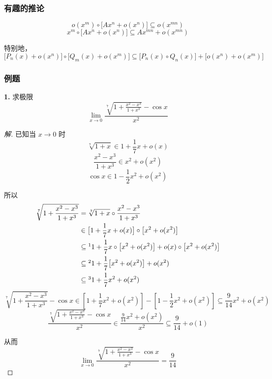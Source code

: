 \subsubsection{有趣的推论}
\begin{theorem}
    \[o(x^m) \circ \bigl[Ax^n + o(x^n)\bigr] \subseteq o(x^{mn}) \tag{1}\]
    \[x^m \circ \bigl[Ax^n + o(x^n)\bigr] \subseteq Ax^{mn} + o(x^{mn}) \tag{2}\]
    
    特别地，
    \[\bigl[P_n(x) + o(x^n)\bigr] \circ \bigl[Q_m(x) + o(x^m)\bigr] \subseteq \big[P_n(x) \circ Q_n(x)\big] + \big[o(x^n) + o(x^m)\big] \tag{3}\]
\end{theorem}

\subsubsection{例题}
\textbf{1.} 求极限
\[\lim_{x \rightarrow 0} \frac{\displaystyle \sqrt[7]{1 + \frac{x^2 - x^3}{1 + x^3}} - \cos x}{x^2}\]
\begin{proof}[解]
    已知当 $x \rightarrow 0$ 时
    \[\sqrt[7]{1 + x} \in 1 + \frac{1}{7}x + o(x)\]
    \[\frac{x^2-x^3}{1+x^3} \in x^2 + o(x^2)\]
    \[\cos x \in 1 - \frac{1}{2}x^2 + o(x^2)\]

    所以
    \begin{align*}
        \sqrt[7]{1 + \frac{x^2 - x^3}{1 + x^3}} &= \sqrt[7]{1 + x} \circ \frac{x^2-x^3}{1+x^3}\\
        &\in \big[1 + \frac{1}{7}x + o(x)\big] \circ \big[x^2 + o(x^2)\big]\\
        &\subseteq\footnotemark 1 + \frac{1}{7} x \circ \big[x^2 + o(x^2)\big] + o(x) \circ \big[x^2 + o(x^2)\big]\\
        &\subseteq\footnotemark 1 + \frac{1}{7}\big[x^2 + o(x^2)\big] + o(x^2)\\
        &\subseteq\footnotemark 1 + \frac{1}{7}x^2 + o(x^2)
    \end{align*}
    \[\sqrt[7]{1 + \frac{x^2 - x^3}{1 + x^3}} - \cos x \in \left[1 + \frac{1}{7}x^2 + o(x^2)\right] - \left[1 - \frac{1}{2}x^2 + o(x^2)\right] \subseteq \frac{9}{14}x^2 + o(x^2)\]
    \[\frac{\displaystyle \sqrt[7]{1 + \frac{x^2 - x^3}{1 + x^3}} - \cos x}{x^2} \in \frac{\displaystyle \frac{9}{14}x^2 + o(x^2)}{x^2} \subseteq \frac{9}{14} + o(1)\]

    从而
    \[\lim_{x \rightarrow 0} \frac{\displaystyle \sqrt[7]{1 + \frac{x^2 - x^3}{1 + x^3}} - \cos x}{x^2} = \frac{9}{14}\]
\end{proof}